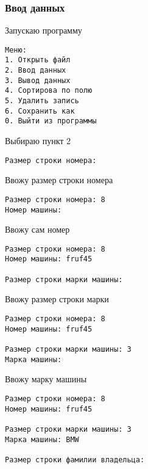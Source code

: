 
\subsubsection{Ввод данных}

Запускаю программу

\begin{tcolorbox}
\begin{verbatim}
Меню:
1. Открыть файл     
2. Ввод данных      
3. Вывод данных     
4. Сортирова по полю
5. Удалить запись    
6. Сохранить как     
0. Выйти из программы
\end{verbatim}
\end{tcolorbox}

Выбираю пункт 2

\begin{tcolorbox}
\begin{verbatim}
Размер строки номера: 
\end{verbatim}
\end{tcolorbox}

Ввожу размер строки номера

\begin{tcolorbox}
\begin{verbatim}
Размер строки номера: 8  
Номер машины: 
\end{verbatim}
\end{tcolorbox}

Ввожу сам номер

\begin{tcolorbox}
\begin{verbatim}
Размер строки номера: 8  
Номер машины: fruf45

Размер строки марки машины: 
\end{verbatim}
\end{tcolorbox}

Ввожу размер строки марки 

\begin{tcolorbox}
\begin{verbatim}
Размер строки номера: 8
Номер машины: fruf45

Размер строки марки машины: 3
Марка машины: 
\end{verbatim}
\end{tcolorbox}

Ввожу марку машины

\begin{tcolorbox}
\begin{verbatim}
Размер строки номера: 8
Номер машины: fruf45

Размер строки марки машины: 3
Марка машины: BMW

Размер строки фамилии владельца: 
\end{verbatim}
\end{tcolorbox}

